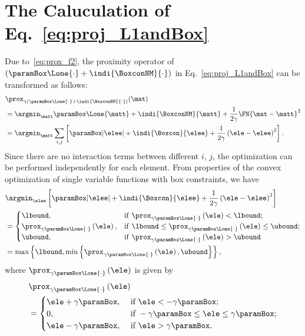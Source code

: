 \documentclass[journal]{IEEEtran}
\begin{document}
\section{The Caluculation of Eq.~\texorpdfstring{\eqref{eq:proj_L1andBox}}{(47)}}
\label{appendix:calc_L1andBox}
Due to~\eqref{eq:prox_f2}, the proximity operator of $(\paramBox \Lone{\cdot} + \indi{\BoxconNM}{\cdot})$ in Eq.~\eqref{eq:proj_L1andBox} can be transformed as follows:
\begin{align}
    \label{eq:proof_L1andBox_1}
    &\prox_{\gamma(\paramBox \Lone{\cdot} + \indi{\BoxconNM}{\cdot})} (\mat) \nonumber \\ 
    &= \argmin_{\matt} \paramBox \Lone{\matt} + \indi{\BoxconNM}{\matt} + \frac{1}{2\gamma} \FN{\mat - \matt}^{2} \nonumber \\
    &= \argmin_{\matt} \sum_{i,j} \left[ \paramBox | \elee | + \indi{\Boxcon}{\elee} + \frac{1}{2\gamma} \left(\ele - \elee \right)^{2} \right].
\end{align}
Since there are no interaction terms between different $i$, $j$, the optimization can be performed independently for each element.
From properties of the convex optimization of single variable functions with box constraints, we have
\begin{align}
    \label{eq:proof_L1andBox_2}
    &\argmin_{\elee} \left[ \paramBox | \elee | + \indi{\Boxcon}{\elee} + \frac{1}{2\gamma} \left(\ele - \elee \right)^{2} \right] \nonumber \\
    &= \begin{cases}
        \lbound, 
            &\mathrm{if} \ \prox_{\gamma \paramBox \Lone{\cdot}}\left(\ele\right) < \lbound; \\
        \prox_{\gamma \paramBox \Lone{\cdot}}\left(\ele\right),
            &\mathrm{if} \ \lbound \leq \prox_{\gamma \paramBox \Lone{\cdot}}\left(\ele\right) \leq \ubound; \\
        \ubound,
            &\mathrm{if} \ \prox_{\gamma \paramBox \Lone{\cdot}}\left(\ele\right) > \ubound
    \end{cases} \nonumber \\
    &= \max \left\{ \lbound, \min\left\{ \prox_{\gamma \paramBox \Lone{\cdot}}\left(\ele\right), \ubound \right\}\right\},
\end{align}
where $\prox_{\gamma \paramBox \Lone{\cdot}}\left(\ele\right)$ is given by
\begin{equation}
\label{eq:proof_L1andBox_3}
    \begin{aligned}
        &\prox_{\gamma \paramBox \Lone{\cdot}}\left(\ele\right) \\
        &=
        \begin{cases}
            \ele + \gamma \paramBox, \ &\mbox{if} \ \ele < - \gamma \paramBox; \\
            0, \ &\mbox{if} \ -\gamma \paramBox \leq \ele \leq \gamma \paramBox; \\
            \ele - \gamma \paramBox, \ &\mbox{if} \ \ele > \gamma \paramBox.
        \end{cases}
    \end{aligned}
\end{equation}
\end{document}

